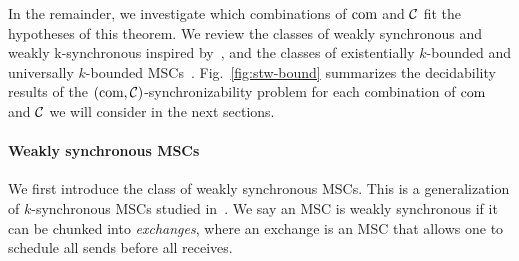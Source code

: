 In the remainder, we investigate which combinations of $\textup{com}$ and $\mathcal{C}$ fit the hypotheses of this theorem.
We review the classes of weakly synchronous and weakly k-synchronous inspired
by~\cite{DBLP:conf/cav/BouajjaniEJQ18},
and the classes of existentially $k$-bounded and universally $k$-bounded MSCs~\cite{genest2004kleene}.
%
%
Fig.~\ref{fig:stw-bound} summarizes the decidability results of the
$(\textup{com},\mathcal{C})$-synchronizability problem for each combination of $\textup{com}$ and $\mathcal{C}$ 
we will consider in the next sections.







\paragraph{\bf Weakly synchronous MSCs}

We first introduce the class of weakly synchronous MSCs. 
This is a generalization of $k$-synchronous MSCs studied 
in~\cite{DBLP:conf/cav/BouajjaniEJQ18}. 
We say an MSC is weakly synchronous if it can be chunked into \emph{exchanges}, where an exchange is an MSC that allows one to schedule all 
sends before all receives. 

